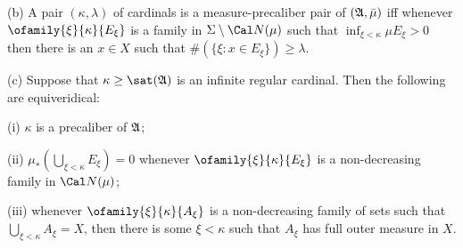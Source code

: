 (b) A pair $(\kappa,\lambda)$ of cardinals is a measure-precaliber pair
of $(\frak A,\bar\mu)$ iff whenever $\ofamily{\xi}{\kappa}{E_{\xi}}$ is
a family in $\Sigma\setminus\Cal N(\mu)$ such that
$\inf_{\xi<\kappa}\mu E_{\xi}>0$ then there is an $x\in X$ such that
$\#(\{\xi:x\in E_{\xi}\})\ge\lambda$.

(c) Suppose that $\kappa\ge\sat(\frak A)$ is an infinite regular cardinal.
Then the following are equiveridical:

\quad (i) $\kappa$ is a precaliber of $\frak A$;

\quad (ii) $\mu_*(\bigcup_{\xi<\kappa}E_{\xi})=0$ whenever
$\ofamily{\xi}{\kappa}{E_{\xi}}$ is a non-decreasing family in
$\Cal N(\mu)$;

\quad (iii) whenever $\ofamily{\xi}{\kappa}{A_{\xi}}$ is a
non-decreasing family of sets such that $\bigcup_{\xi<\kappa}A_{\xi}=X$,
then there is some $\xi<\kappa$ such that $A_{\xi}$ has full outer
measure in $X$.

